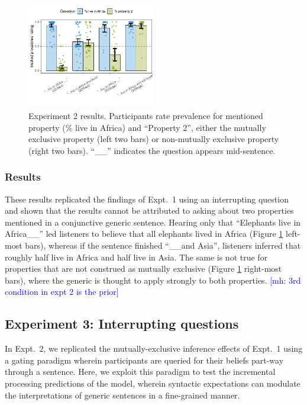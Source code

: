 \documentclass[10pt,letterpaper]{article}
\newcommand{\mh}[1]{{\textcolor{Blue}{[mh: #1]}}}
\begin{document}
\begin{figure}[h]
  \centering
    \includegraphics[width=0.5\textwidth]{expt2_summary}
  \caption{Experiment 2 results.  Participants rate prevalence for mentioned property (\% live in Africa) and ``Property 2'', either the mutually exclusive property (left two bars) or non-mutually exclusive property (right two bars). ``\_\_'' indicates the question appears mid-sentence.}
  \label{fig:expt2}
  \end{figure}


\subsubsection{Results}

These results replicated the findings of Expt.~1 using an interrupting question and shown that the results cannot be attributed to asking about two properties mentioned in a conjunctive generic sentence. Hearing only that ``Elephants live in Africa\_\_'' led listeners to believe that all elephants lived in Africa (Figure \ref{fig:expt2} left-most bars), whereas if the sentence finished ``\_\_and Asia'', listeners inferred that roughly half live in Africa and half live in Asia. The same is not true for properties that are not construed as mutually exclusive (Figure \ref{fig:expt2} right-most bars), where the generic is thought to apply strongly to both properties. 
\mh{3rd condition in expt 2 is the prior}



\subsection{Experiment 3: Interrupting questions}

In Expt.~2, we replicated the mutually-exclusive inference effects of Expt.~1 using a gating paradigm wherein participants are queried for their beliefs part-way through a sentence. 
Here, we exploit this paradigm to test the incremental processing predictions of the model, wherein syntactic expectations can modulate the interpretations of generic sentences in a fine-grained manner. 
\end{document}
